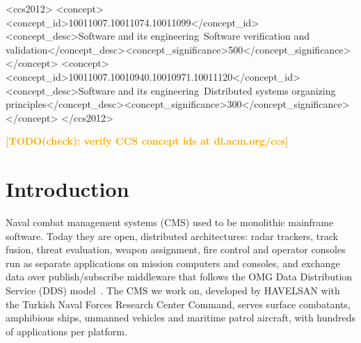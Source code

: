 \documentclass[sigconf,screen]{acmart}
\newcommand{\TODOcheck}[1]{\textcolor{orange}{\textbf{[TODO(check): #1]}}}
\begin{document}
\begin{CCSXML}
<ccs2012>
<concept><concept_id>10011007.10011074.10011099</concept_id><concept_desc>Software and its engineering~Software verification and validation</concept_desc><concept_significance>500</concept_significance></concept>
<concept><concept_id>10011007.10010940.10010971.10011120</concept_id><concept_desc>Software and its engineering~Distributed systems organizing principles</concept_desc><concept_significance>300</concept_significance></concept>
</ccs2012>
\end{CCSXML}
\TODOcheck{verify CCS concept ids at dl.acm.org/ccs}


\maketitle

\section{Introduction}

Naval combat management systems (CMS) used to be monolithic mainframe software. Today they are open, distributed architectures: radar trackers, track fusion, threat evaluation, weapon assignment, fire control and operator consoles run as separate applications on mission computers and consoles, and exchange data over publish/subscribe middleware that follows the OMG Data Distribution Service (DDS) model~\cite{omg2015dds}. The CMS we work on, developed by HAVELSAN with the Turkish Naval Forces Research Center Command, serves surface combatants, amphibious ships, unmanned vehicles and maritime patrol aircraft, with hundreds of applications per platform.
\end{document}
